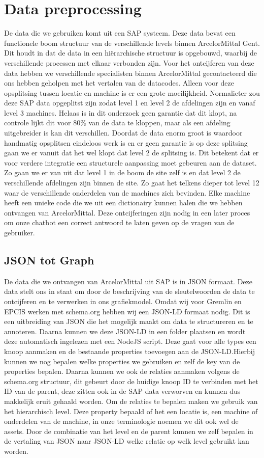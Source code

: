 \section{Data preprocessing}
De data die we gebruiken komt uit een SAP systeem. Deze data bevat een functionele boom structuur van de verschillende levels binnen ArcelorMittal Gent.
Dit houdt in dat de data in een hiërarchische structuur is opgebouwd, waarbij de verschillende processen met elkaar verbonden zijn.
Voor het ontcijferen van deze data hebben we verschillende specialisten binnen ArcelorMittal gecontacteerd die ons hebben geholpen met het vertalen van de datacodes.
Alleen voor deze opsplitsing tussen locatie en machine is er een grote moeilijkheid. Normalieter zou deze SAP data opgeplitst zijn zodat level 1 en level 2 de afdelingen zijn en vanaf level 3 machines. 
Helaas is in dit onderzoek geen garantie dat dit klopt, na controle lijkt dit voor 80\% van de data te kloppen, maar als een afdeling uitgebreider is kan dit verschillen.
Doordat de data enorm groot is waardoor handmatig opsplitsen eindeloos werk is en er geen garantie is op deze splitsing gaan we er vanuit dat het wel klopt dat level 2 de splitsing is. 
Dit betekent dat er voor verdere integratie een structurele aanpassing moet gebeuren aan de dataset.
Zo gaan we er van uit dat level 1 in de boom de site zelf is en dat level 2 de verschillende afdelingen zijn binnen de site. Zo gaat het telkens dieper tot level 12 waar de verschillende onderdelen van de machines zich bevinden.
Elke machine heeft een unieke code die we uit een dictionairy kunnen halen die we hebben ontvangen van ArcelorMittal.
Deze ontcijferingen zijn nodig in een later proces om onze chatbot een correct antwoord te laten geven op de vragen van de gebruiker.

\subsection{JSON tot Graph}
De data die we ontvangen van ArcelorMittal uit SAP is in JSON formaat. Deze data stelt ons in staat om door de beschrijving van de sleutelwoorden de data te ontcijferen en te verwerken in ons grafiekmodel.
Omdat wij voor Gremlin en EPCIS werken met schema.org hebben wij een JSON-LD formaat nodig. Dit is een uitbreiding van JSON die het mogelijk maakt om data te structureren en te annoteren.
Daarna kunnen we deze JSON-LD in een folder plaatsen en wordt deze automatisch ingelezen met een NodeJS script.
Deze gaat voor alle types een knoop aanmaken en de bestaande properties toevoegen aan de JSON-LD.\@ Hierbij kunnen we nog bepalen welke properties we gebruiken en zelf de key van de properties bepalen.
Daarna kunnen we ook de relaties aanmaken volgens de schema.org structuur, dit gebeurt door de huidige knoop ID te verbinden met het ID van de parent, deze zitten ook in de SAP data verworven en kunnen dus makkelijk eruit gehaald worden.
Om de relaties te bepalen maken we gebruik van het hierarchisch level. Deze property bepaald of het een locatie is, een machine of onderdelen van de machine, in onze terminologie noemen we dit ook wel de assets.
Door de combinatie van het level en de parent kunnen we zelf bepalen in de vertaling van JSON naar JSON-LD welke relatie op welk level gebruikt kan worden.

